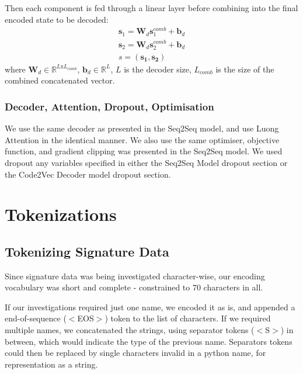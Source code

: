 Then each component is fed through a linear layer before combining into the final encoded state to be decoded:
\begin{align}
    \mathbf{s}_1 = \mathbf{W}_d\mathbf{s}^{comb}_1 + \mathbf{b}_d\\
    \mathbf{s}_2 = \mathbf{W}_d\mathbf{s}^{comb}_2 + \mathbf{b}_d\\
    s = (\mathbf{s_1}, \mathbf{s_2})
\end{align}
where $\mathbf{W}_d \in \mathbb{R}^{L\text{x}L_{comb}}$, 
$\mathbf{b}_d \in \mathbb{R}^{L}$,
$L$ is the decoder size,
$L_{comb}$ is the size of the combined concatenated vector.


\subsubsection{Decoder, Attention, Dropout, Optimisation}
We use the same decoder as presented in the Seq2Seq model, and use Luong Attention in the identical manner.
We also use the same optimiser, objective function, and gradient clipping was presented in the Seq2Seq model.
We used dropout any variables specified in either the Seq2Seq Model dropout section or the Code2Vec Decoder model dropout section.


\section{Tokenizations} %
\label{sec:tokenizations}

\subsection{Tokenizing Signature Data}

Since signature data was being investigated character-wise, our encoding vocabulary was short and complete - constrained to 70 characters in all.

If our investigations required just one name, we encoded it as is, and appended a end-of-sequence ($<$EOS$>$) token to the list of characters.
If we required multiple names, we concatenated the strings, using separator tokens ($<$S$>$) in between, which would indicate the type of the previous name. Separators tokens could then be replaced by single characters invalid in a python name, for representation as a string.

